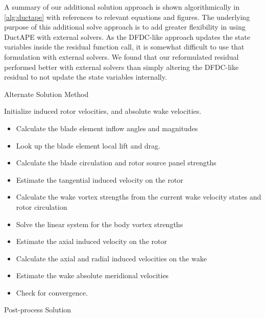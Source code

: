 A summary of our additional solution approach is shown algorithmically in \cref{alg:ductape} with references to relevant equations and figures.
%
The underlying purpose of this additional solve approach is to add greater flexibility in using DuctAPE with external solvers.
%
As the DFDC-like approach updates the state variables inside the residual function call, it is somewhat difficult to use that formulation with external solvers.
%
We found that our reformulated residual performed better with external solvers than simply altering the DFDC-like residual to not update the state variables internally.
%

\begin{algorithm}
\caption{Alternate Solution Method}\label{alg:ductape}
\begin{algorithmic}
\State Initialize induced rotor velocities, and absolute wake velocities.
\begin{itemize}
    \renewcommand\labelitemi{\(\cdot\)}
    \setlength{\itemindent}{1em}
    \item Calculate the blade element inflow angles and magnitudes %
    \item Look up the blade element local lift and drag.
    \item Calculate the blade circulation and rotor source panel strengths %
    \item Estimate the tangential induced velocity on the rotor %
    \item Calculate the wake vortex strengths from the current wake velocity states and rotor circulation %
    \item Solve the linear system for the body vortex strengths %
    \item Estimate the axial induced velocity on the rotor %
    \item Calculate the axial and radial induced velocities on the wake %
    \item Estimate the wake absolute meridional velocities %
    \item Check for convergence.
\end{itemize}
\EndWhile
\State Post-process Solution
\end{algorithmic}
\end{algorithm}

